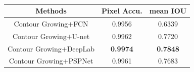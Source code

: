 \begin{table}[t]
\begin{center}
\caption{} \label{tab:report2}
\begin{tabular}{|c|c|c|}
  \hline
  Methods & Pixel Accu. & mean IOU
  \\
  \hline
  Contour Growing$+$FCN & 0.9956 & 0.6339 \\
  Contour Growing$+$U-net & 0.9962 & 0.7720 \\
  Contour Growing$+$DeepLab & \textbf{0.9974} & \textbf{0.7848} \\
  Contour Growing$+$PSPNet & 0.9961 & 0.7683 \\
  \hline
\end{tabular}
\end{center}
\end{table}


